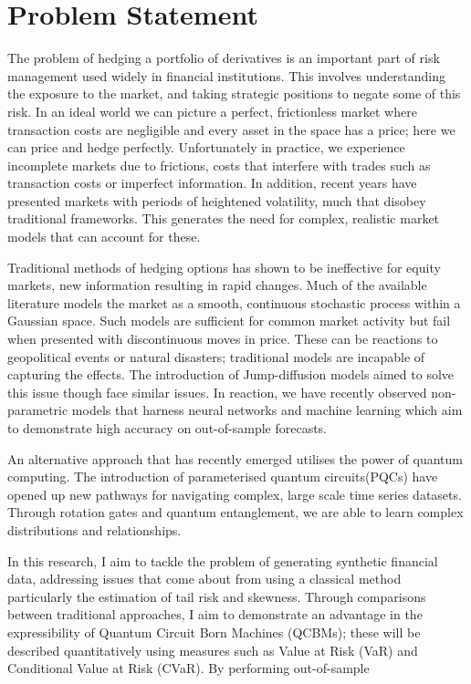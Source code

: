 \documentclass[12pt]{article}
\newcommand{\newp}
    {
    \vskip 0.5cm 
  }
\numberwithin{equation}{section}
\begin{document}
\section{Problem Statement}
The problem of hedging a portfolio of derivatives is an important part of 
risk management used widely in financial institutions. This involves understanding 
the exposure to the market, and taking strategic positions to negate some of this 
risk. In an ideal world we can picture a perfect, 
frictionless market where transaction costs are negligible and every asset in 
the space has a price; here we can price and hedge perfectly. Unfortunately in 
practice, we experience incomplete markets due to frictions, costs that interfere 
with trades such as transaction costs or imperfect information. In addition, recent 
years have presented markets with periods of heightened volatility, much that disobey 
traditional frameworks. This generates the need for complex, realistic market 
models that can account for these.
\newp
Traditional methods of hedging options has shown to be ineffective for equity 
markets, new information resulting in rapid changes. Much of the available 
literature models the market as a smooth, continuous stochastic process within 
a Gaussian space. Such models are sufficient for common market activity but fail 
when presented with discontinuous moves in price. These can be reactions to 
geopolitical events or natural disasters; traditional
models are incapable of capturing the effects. The introduction of Jump-diffusion 
models aimed to solve this issue though face similar issues. In reaction, we have 
recently observed non-parametric models that harness neural networks and machine 
learning which aim to demonstrate high accuracy on out-of-sample forecasts.
\newp
An alternative approach that has recently emerged utilises the power of 
quantum computing. The introduction of parameterised quantum circuits(PQCs) have 
opened up new pathways for navigating complex, large scale time series datasets. 
Through rotation gates and quantum entanglement, we are able to learn complex 
distributions and relationships. 
\newp
In this research, I aim to tackle the problem 
of generating synthetic financial data, addressing issues that come about from 
using a classical method particularly the estimation of tail risk and skewness. 
Through comparisons between traditional approaches, 
I aim to demonstrate an advantage in the expressibility of Quantum Circuit Born 
Machines (QCBMs); these will be described quantitatively using measures such as 
Value at Risk (VaR) and Conditional Value at Risk (CVaR). By performing out-of-sample 
\end{document}

